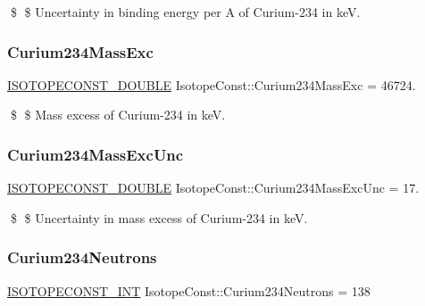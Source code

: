 \$ \$ Uncertainty in binding energy per A of Curium-\/234 in keV. \mbox{\label{group___isotope_const-_curium-_cm234_ga22d682a148047ad8336f2f8e3b53247b}} 
\subsubsection{\texorpdfstring{Curium234\+Mass\+Exc}{Curium234MassExc}}
{\footnotesize\ttfamily \mbox{\hyperlink{group___isotope_const-_macros_ga8f45a7272ce02c0b4c65c44636ed719a}{I\+S\+O\+T\+O\+P\+E\+C\+O\+N\+S\+T\+\_\+\+D\+O\+U\+B\+LE}} Isotope\+Const\+::\+Curium234\+Mass\+Exc = 46724.}

\$ \$ Mass excess of Curium-\/234 in keV. \mbox{\label{group___isotope_const-_curium-_cm234_gac5a4d559b6b90afdfc7e659d058b9d40}} 
\subsubsection{\texorpdfstring{Curium234\+Mass\+Exc\+Unc}{Curium234MassExcUnc}}
{\footnotesize\ttfamily \mbox{\hyperlink{group___isotope_const-_macros_ga8f45a7272ce02c0b4c65c44636ed719a}{I\+S\+O\+T\+O\+P\+E\+C\+O\+N\+S\+T\+\_\+\+D\+O\+U\+B\+LE}} Isotope\+Const\+::\+Curium234\+Mass\+Exc\+Unc = 17.}

\$ \$ Uncertainty in mass excess of Curium-\/234 in keV. \mbox{\label{group___isotope_const-_curium-_cm234_ga4450b6d72fd5802ac434aba960c2904e}} 
\subsubsection{\texorpdfstring{Curium234\+Neutrons}{Curium234Neutrons}}
{\footnotesize\ttfamily \mbox{\hyperlink{group___isotope_const-_macros_ga5f18360b3e99483a35c32d789e62621c}{I\+S\+O\+T\+O\+P\+E\+C\+O\+N\+S\+T\+\_\+\+I\+NT}} Isotope\+Const\+::\+Curium234\+Neutrons = 138}

